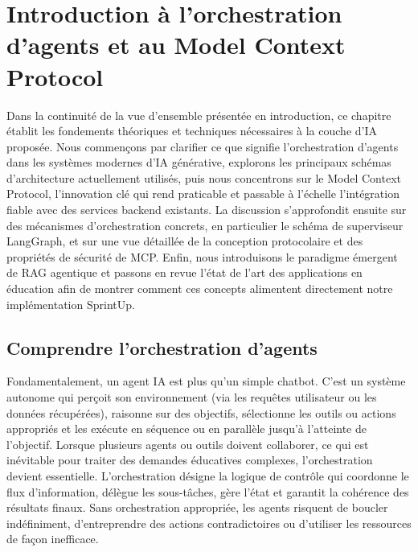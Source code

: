 \chapter{Introduction à l'orchestration d'agents et au Model Context Protocol}

Dans la continuité de la vue d'ensemble présentée en introduction, ce chapitre établit
les fondements théoriques et techniques nécessaires à la couche d'IA proposée. Nous
commençons par clarifier ce que signifie l'orchestration d'agents dans les systèmes
modernes d'IA générative, explorons les principaux schémas d'architecture actuellement
utilisés, puis nous concentrons sur le Model Context Protocol, l'innovation clé qui
rend praticable et passable à l'échelle l'intégration fiable avec des services backend existants.
La discussion s'approfondit ensuite sur des mécanismes d'orchestration concrets, en
particulier le schéma de superviseur LangGraph, et sur une vue détaillée de la
conception protocolaire et des propriétés de sécurité de MCP. Enfin, nous introduisons
le paradigme émergent de RAG agentique et passons en revue l'état de l'art des
applications en éducation afin de montrer comment ces concepts alimentent directement
notre implémentation SprintUp.

\section{Comprendre l'orchestration d'agents}

Fondamentalement, un agent IA est plus qu'un simple chatbot. C'est un système autonome
qui perçoit son environnement (via les requêtes utilisateur ou les données récupérées),
raisonne sur des objectifs, sélectionne les outils ou actions appropriés et les exécute
en séquence ou en parallèle jusqu'à l'atteinte de l'objectif. Lorsque plusieurs agents
ou outils doivent collaborer, ce qui est inévitable pour traiter des demandes
éducatives complexes, l'orchestration devient essentielle. L'orchestration désigne la
logique de contrôle qui coordonne le flux d'information, délègue les sous-tâches, gère
l'état et garantit la cohérence des résultats finaux. Sans orchestration appropriée, les
agents risquent de boucler indéfiniment, d'entreprendre des actions contradictoires ou
d'utiliser les ressources de façon inefficace.

